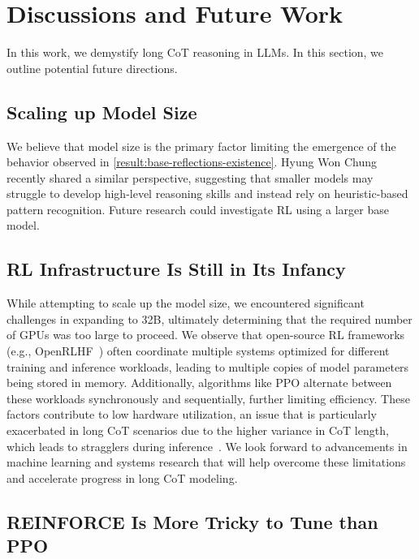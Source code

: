 
\section{Discussions and Future Work}
In this work, we demystify long CoT reasoning in LLMs. In this section, we outline potential future directions.


\subsection{Scaling up Model Size}
We believe that model size is the primary factor limiting the emergence of the behavior observed in \autoref{result:base-reflections-existence}. Hyung Won Chung~\cite{Chung2024slides} recently shared a similar perspective, suggesting that smaller models may struggle to develop high-level reasoning skills and instead rely on heuristic-based pattern recognition. Future research could investigate RL using a larger base model.

\subsection{RL Infrastructure Is Still in Its Infancy
}
While attempting to scale up the model size, we encountered significant challenges in expanding to 32B, ultimately determining that the required number of GPUs was too large to proceed. We observe that open-source RL frameworks (e.g., OpenRLHF~\cite{hu2024openrlhfeasytousescalablehighperformance}) often coordinate multiple systems optimized for different training and inference workloads, leading to multiple copies of model parameters being stored in memory. Additionally, algorithms like PPO alternate between these workloads synchronously and sequentially, further limiting efficiency. These factors contribute to low hardware utilization, an issue that is particularly exacerbated in long CoT scenarios due to the higher variance in CoT length, which leads to stragglers during inference~\cite{kimi2025k15}. We look forward to advancements in machine learning and systems research that will help overcome these limitations and accelerate progress in long CoT modeling.

\subsection{REINFORCE Is More Tricky to Tune than PPO}
\label{result:reward-reinforce}

